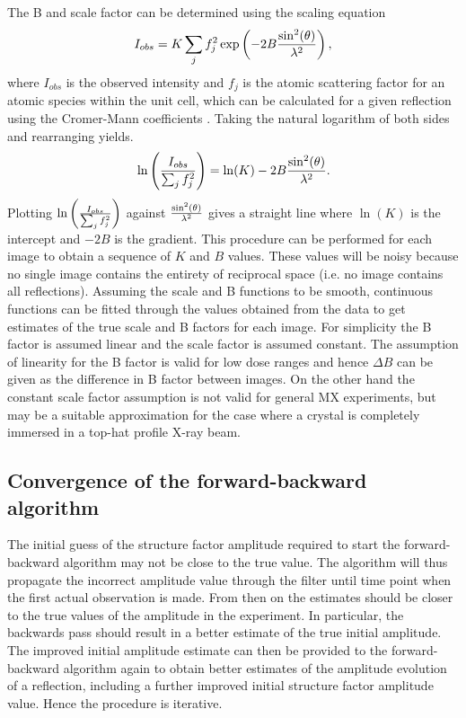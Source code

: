 The B and scale factor can be determined using the scaling equation
\begin{equation}
    I_{obs} = K \sum_j f_j^2 \exp\left(-2B \frac{\sin^2(\theta)}{\lambda^2}\right),
\end{equation}
where $I_{obs}$ is the observed intensity and $f_j$ is the atomic scattering factor for an atomic species within the unit cell, which can be calculated for a given reflection using the Cromer-Mann coefficients \cite{cromer1968x}.
Taking the natural logarithm of both sides and rearranging yields.
\begin{equation}
    \ln \left( \frac{I_{obs}}{\sum_j f_j^2}\right) = \ln(K) - 2B \frac{\sin^2(\theta)}{\lambda^2}.
\end{equation}
Plotting $\ln \left( \frac{I_{obs}}{\sum_j f_j^2}\right)$ against $ \frac{\sin^2(\theta)}{\lambda^2} $ gives a straight line where $\ln(K)$ is the intercept and $-2B$ is the gradient.
This procedure can be performed for each image to obtain a sequence of $K$ and $B$ values.
These values will be noisy because no single image contains the entirety of reciprocal space (i.e. no image contains all reflections).
Assuming the scale and B functions to be smooth, continuous functions can be fitted through the values obtained from the data to get estimates of the true scale and B factors for each image.
For simplicity the B factor is assumed linear and the scale factor is assumed constant.
The assumption of linearity for the B factor is valid for low dose ranges \cite{kmetko2006,borek2007many,leal2012} and hence $\Delta B$ can be given as the difference in B factor between images.
On the other hand the constant scale factor assumption is not valid for general MX experiments, but may be a suitable approximation for the case where a crystal is completely immersed in a top-hat profile X-ray beam.

\subsection{Convergence of the forward-backward algorithm}
\label{sub:Convergence of the forward-backward algorithm}
The initial guess of the structure factor amplitude required to start the forward-backward algorithm may not be close to the true value.
The algorithm will thus propagate the incorrect amplitude value through the filter until time point when the first actual observation is made.
From then on the estimates should be closer to the true values of the amplitude in the experiment.
In particular, the backwards pass should result in a better estimate of the true initial amplitude.
The improved initial amplitude estimate can then be provided to the forward-backward algorithm again to obtain better estimates of the amplitude evolution of a reflection, including a further improved initial structure factor amplitude value.
Hence the procedure is iterative.

